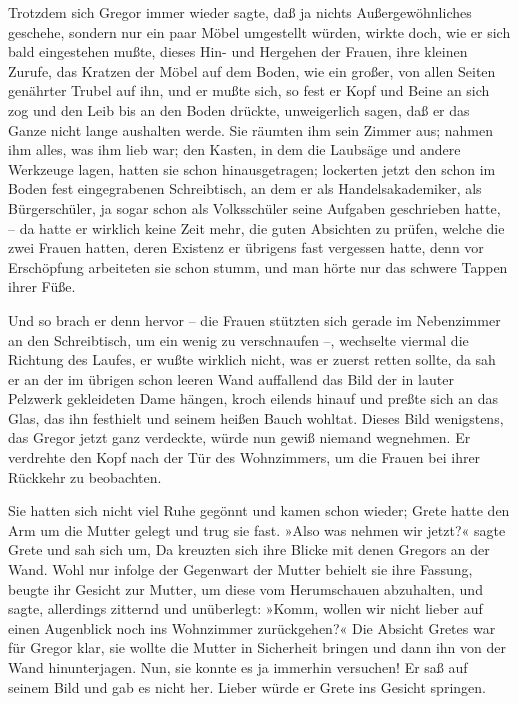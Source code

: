 Trotzdem sich Gregor immer wieder sagte, daß ja nichts Außergewöhnliches
geschehe, sondern nur ein paar Möbel umgestellt würden, wirkte doch, wie
er sich bald eingestehen mußte, dieses Hin- und Hergehen der Frauen,
ihre kleinen Zurufe, das Kratzen der Möbel auf dem Boden, wie ein
großer, von allen Seiten genährter Trubel auf ihn, und er mußte sich, so
fest er Kopf und Beine an sich zog und den Leib bis an den Boden
drückte, unweigerlich sagen, daß er das Ganze nicht lange aushalten
werde. Sie räumten ihm sein Zimmer aus; nahmen ihm alles, was ihm lieb
war; den Kasten, in dem die Laubsäge und andere Werkzeuge lagen, hatten
sie schon hinausgetragen; lockerten jetzt den schon im Boden fest
eingegrabenen Schreibtisch, an dem er als Handelsakademiker, als
Bürgerschüler, ja sogar schon als Volksschüler seine Aufgaben
geschrieben hatte, -- da hatte er wirklich keine Zeit mehr, die guten
Absichten zu prüfen, welche die zwei Frauen hatten, deren Existenz er
übrigens fast vergessen hatte, denn vor Erschöpfung arbeiteten sie schon
stumm, und man hörte nur das schwere Tappen ihrer Füße.

Und so brach er denn hervor -- die Frauen stützten sich gerade im
Nebenzimmer an den Schreibtisch, um ein wenig zu verschnaufen --,
wechselte viermal die Richtung des Laufes, er wußte wirklich nicht, was
er zuerst retten sollte, da sah er an der im übrigen schon leeren Wand
auffallend das Bild der in lauter Pelzwerk gekleideten Dame hängen,
kroch eilends hinauf und preßte sich an das Glas, das ihn festhielt und
seinem heißen Bauch wohltat. Dieses Bild wenigstens, das Gregor jetzt
ganz verdeckte, würde nun gewiß niemand wegnehmen. Er verdrehte den Kopf
nach der Tür des Wohnzimmers, um die Frauen bei ihrer Rückkehr zu
beobachten.

Sie hatten sich nicht viel Ruhe gegönnt und kamen schon wieder; Grete
hatte den Arm um die Mutter gelegt und trug sie fast. »Also was nehmen
wir jetzt?« sagte Grete und sah sich um, Da kreuzten sich ihre Blicke
mit denen Gregors an der Wand. Wohl nur infolge der Gegenwart der Mutter
behielt sie ihre Fassung, beugte ihr Gesicht zur Mutter, um diese vom
Herumschauen abzuhalten, und sagte, allerdings zitternd und unüberlegt:
»Komm, wollen wir nicht lieber auf einen Augenblick noch ins Wohnzimmer
zurückgehen?« Die Absicht Gretes war für Gregor klar, sie wollte die
Mutter in Sicherheit bringen und dann ihn von der Wand hinunterjagen.
Nun, sie konnte es ja immerhin versuchen! Er saß auf seinem Bild und
gab es nicht her. Lieber würde er Grete ins Gesicht springen.

